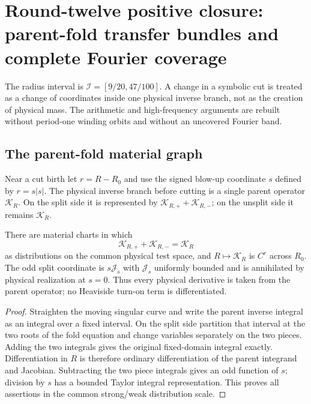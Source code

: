 \section{Round-twelve positive closure: parent-fold transfer bundles and complete Fourier coverage}
\label{sec:r12-a2}

The radius interval is $\mathcal I=[9/20,47/100]$.  A change in a symbolic
cut is treated as a change of coordinates inside one physical inverse branch,
not as the creation of physical mass.  The arithmetic and high-frequency
arguments are rebuilt without period-one winding orbits and without an
uncovered Fourier band.

\subsection{The parent-fold material graph}

Near a cut birth let $r=R-R_0$ and use the signed blow-up coordinate
$s$ defined by $r=s|s|$.  The physical inverse branch before cutting is a
single parent operator $\mathcal K_R$.  On the split side it is represented by
$\mathcal K_{R,+}+\mathcal K_{R,-}$; on the unsplit side it remains
$\mathcal K_R$.

\begin{lemma}
\label{lem:r12-a2-fold}
There are material charts in which
\[
 \mathcal K_{R,+}+\mathcal K_{R,-}=\mathcal K_R
\]
as distributions on the common physical test space, and
$R\mapsto\mathcal K_R$ is $C^r$ across $R_0$.  The odd split coordinate is
$s\mathcal J_s$ with $\mathcal J_s$ uniformly bounded and is annihilated by
physical realization at $s=0$.  Thus every physical derivative is taken from
the parent operator; no Heaviside turn-on term is differentiated.
\end{lemma}

\begin{proof}
Straighten the moving singular curve and write the parent inverse integral as
an integral over a fixed interval.  On the split side partition that interval
at the two roots of the fold equation and change variables separately on the
two pieces.  Adding the two integrals gives the original fixed-domain
integral exactly.  Differentiation in $R$ is therefore ordinary
differentiation of the parent integrand and Jacobian.  Subtracting the two
piece integrals gives an odd function of $s$; division by $s$ has a bounded
Taylor integral representation.  This proves all assertions in the common
strong/weak distribution scale.
\end{proof}

